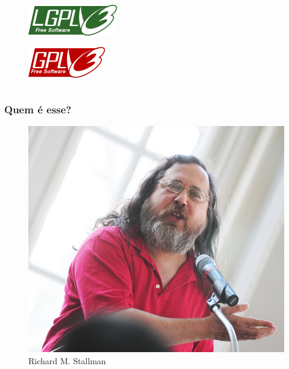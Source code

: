 \documentclass[xcolor=dvipsnames]{beamer}
\begin{document}
\begin{frame}
\begin{columns}
\begin{column}[c]{3cm}
	\begin{figure}
	\includegraphics[scale=0.5]{lgpl3.png}\\
	\end{figure}
	\begin{figure}
	\includegraphics[scale=0.5]{gpl3.png}\\
	\end{figure}
\end{column}
\end{columns}	
\end{frame}


 \begin{frame}
 	\frametitle{Quem é esse?}
 	\begin{figure}
 	\begin{center}
 	\includegraphics[scale=0.9]{rms.jpg}\\
 	Richard M. Stallman
     
 	\end{center}
 	\end{figure}
 \end{frame}
\end{document}

